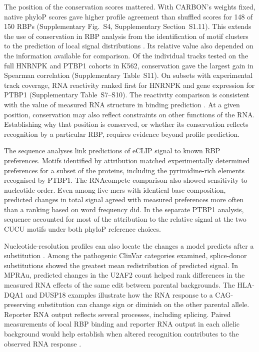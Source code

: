\documentclass[webpdf,contemporary,large]{current_assets/oup-authoring-template}
\newcommand{\supfig}[1]{Supplementary Fig.~#1}
\newcommand{\suptab}[1]{Supplementary Table~#1}
\newcommand{\supsect}[1]{Supplementary Section~#1}
\begin{document}
The position of the conservation scores mattered. With CARBON's weights fixed, native phyloP scores gave higher profile agreement than shuffled scores for 148 of 150 RBPs (\supfig{S4}, \supsect{S1.11}). This extends the use of conservation in RBP analysis from the identification of motif clusters to the prediction of local signal distributions \citep{zhang2013mcarts}. Its relative value also depended on the information available for comparison. Of the individual tracks tested on the full HNRNPK and PTBP1 cohorts in K562, conservation gave the largest gain in Spearman correlation (\suptab{S11}). On subsets with experimental track coverage, RNA reactivity ranked first for HNRNPK and gene expression for PTBP1 (\suptab{S7--S10}). The reactivity comparison is consistent with the value of measured RNA structure in binding prediction \citep{sun2021prismnet}. At a given position, conservation may also reflect constraints on other functions of the RNA. Establishing why that position is conserved, or whether its conservation reflects recognition by a particular RBP, requires evidence beyond profile prediction.

The sequence analyses link predictions of eCLIP signal to known RBP preferences. Motifs identified by attribution matched experimentally determined preferences for a subset of the proteins, including the pyrimidine-rich elements recognised by PTBP1. The RNAcompete comparison also showed sensitivity to nucleotide order. Even among five-mers with identical base composition, predicted changes in total signal agreed with measured preferences more often than a ranking based on word frequency did. In the separate PTBP1 analysis, sequence accounted for most of the attribution to the relative signal at the two CUCU motifs under both phyloP reference choices.

Nucleotide-resolution profiles can also locate the changes a model predicts after a substitution \citep{horlacher2023rbpnet,liu2025ideepb,gronning2020deepclip}. Among the pathogenic ClinVar categories examined, splice-donor substitutions showed the greatest mean redistribution of predicted signal. In MPRAu, predicted changes in the U2AF2 count helped rank differences in the measured RNA effects of the same edit between parental backgrounds. The HLA-DQA1 and DUSP18 examples illustrate how the RNA response to a CAG-preserving substitution can change sign or diminish on the other parental allele. Reporter RNA output reflects several processes, including splicing. Paired measurements of local RBP binding and reporter RNA output in each allelic background would help establish when altered recognition contributes to the observed RNA response \citep{dao2025cryptic,perezperri2023landscapes}.
\end{document}
